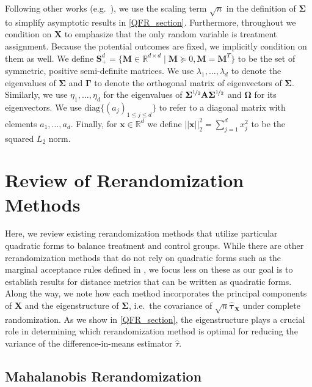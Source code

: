 \documentclass[11pt,twoside]{article}
\theoremstyle{definition}
\theoremstyle{remark}
\begin{document}
Following other works (e.g.\ \cite{li2018asymptotic}), we use the scaling term $\sqrt{n}$ in the definition of $\mathbf{\Sigma}$ to simplify asymptotic results in \cref{QFR_section}. Furthermore, throughout we condition on $\mathbf{X}$ to emphasize that the only random variable is treatment assignment. Because the potential outcomes are fixed, we implicitly condition on them as well. We define $\mathbf{S}^d_{+} = \{ \mathbf{M} \in \mathbb{R}^{d \times d} \mid \mathbf{M} \succeq 0, \mathbf{M} = \mathbf{M}^T \}$ to be the set of symmetric, positive semi-definite matrices. We use $\lambda_1, \ldots, \lambda_d$ to denote the eigenvalues of $\mathbf{\Sigma}$ and $\mathbf{\Gamma}$ to denote the orthogonal matrix of eigenvectors of $\mathbf{\Sigma}$. Similarly, we use $\eta_1, \ldots, \eta_d$ for the eigenvalues of $\mathbf{\Sigma}^{\nicefrac{1}{2}} \mathbf{A} \mathbf{\Sigma}^{\nicefrac{1}{2}}$ and $\mathbf{\Omega}$ for its eigenvectors. We use $\text{diag}\{(a_{j})_{1 \leq j \leq d} \}$ to refer to a diagonal matrix with elements $a_1, \ldots, a_d$. Finally, for $\mathbf{x} \in \mathbb{R}^d$ we define $||\mathbf{x}||^2_2 = \sum^d_{j=1}x^2_j$ to be the squared $L_2$ norm.

\section{Review of Rerandomization Methods} \label{review}


Here, we review existing rerandomization methods that utilize particular quadratic forms to balance treatment and control groups. While there are other rerandomization methods that do not rely on quadratic forms such as the marginal acceptance rules defined in \cite{zhao2021no}, we focus less on these as our goal is to establish results for distance metrics that can be written as quadratic forms. Along the way, we note how each method incorporates the principal components of $\mathbf{X}$ and the eigenstructure of $\mathbf{\Sigma}$, i.e.\ the covariance of $\sqrt{n} \widehat{\bm{\tau}}_{\mathbf{X}}$ under complete randomization. As we show in \cref{QFR_section}, the eigenstructure plays a crucial role in determining which rerandomization method is optimal for reducing the variance of the difference-in-means estimator $\widehat{\tau}$.

\subsection{Mahalanobis Rerandomization}
\end{document}

